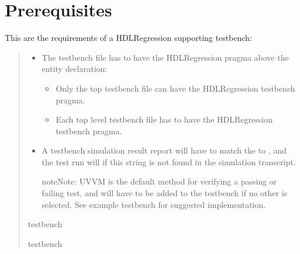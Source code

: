 \documentclass[letterpaper,10pt,english]{sphinxmanual}
\begin{document}
\section{Prerequisites}
\label{\detokenize{testbench:prerequisites}}
\sphinxAtStartPar
This are the requirements of a HDLRegression supporting testbench:
\begin{quote}
\begin{itemize}
\item {} 
\sphinxAtStartPar
The testbench file has to have the HDLRegression pragma above the entity declaration:
\begin{itemize}
\item {} 
\sphinxAtStartPar
Only the top testbench file can have the HDLRegression testbench pragma.

\item {} 
\sphinxAtStartPar
Each top level testbench file has to have the HDLRegression testbench pragma.

\end{itemize}

\item {} 
\sphinxAtStartPar
A testbench simulation result report will have to match the {\hyperref[\detokenize{api:set-result-check-string}]{}} to
, and the test run will  if this string is not found in the simulation transcript.

\begin{sphinxadmonition}{note}{Note:}
\sphinxAtStartPar
UVVM  is the default method for verifying a passing or failing test, and will have
to be added to the testbench if no other  is selected. See example testbench for suggested
implementation.
\end{sphinxadmonition}

\end{itemize}

\sphinxAtStartPar
{} testbench

\begin{sphinxVerbatim}[commandchars=\\\{\}]
\end{sphinxVerbatim}

\sphinxAtStartPar
{} testbench


\end{quote}
\end{document}
